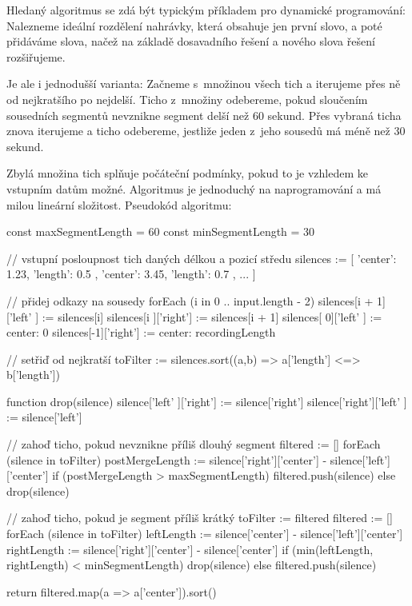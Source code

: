 Hledaný algoritmus se zdá být typickým příkladem pro dynamické programování:
Nalezneme ideální rozdělení nahrávky, která obsahuje jen první slovo, a poté
přidáváme slova, načež na základě dosavadního řešení a nového slova řešení
rozšiřujeme.

Je ale i jednodušší varianta: Začneme s~množinou všech tich a iterujeme přes ně
od nejkratšího po nejdelší. Ticho z~množiny odebereme, pokud sloučením sousedních
segmentů nevznikne segment delší než 60 sekund. Přes vybraná ticha znova
iterujeme a ticho odebereme, jestliže jeden z~jeho sousedů má méně než 30
sekund.

Zbylá množina tich splňuje počáteční podmínky, pokud to je vzhledem ke vstupním
datům možné. Algoritmus je jednoduchý na naprogramování a má milou
lineární složitost. Pseudokód algoritmu:

\begin{code}
const maxSegmentLength = 60
const minSegmentLength = 30

// vstupní posloupnost tich daných délkou a pozicí středu
silences := [
  { 'center': 1.23, 'length': 0.5 },
  { 'center': 3.45, 'length': 0.7 },
  ...
]

// přidej odkazy na sousedy
forEach (i in 0 .. input.length - 2) {
  silences[i + 1]['left' ] := silences[i]
  silences[i    ]['right'] := silences[i + 1]
}
silences[ 0]['left' ] := { center: 0 }
silences[-1]['right'] := { center: recordingLength }

// setřiď od nejkratší
toFilter := silences.sort((a,b) => a['length'] <=> b['length'])

function drop(silence) {
  silence['left' ]['right'] := silence['right']
  silence['right']['left' ] := silence['left']
}

// zahoď ticho, pokud nevznikne příliš dlouhý segment
filtered := []
forEach (silence in toFilter) {
  postMergeLength
    := silence['right']['center'] - silence['left']['center']
  if (postMergeLength > maxSegmentLength) {
    filtered.push(silence)
  } else {
    drop(silence)
  }
}

// zahoď ticho, pokud je segment příliš krátký
toFilter := filtered
filtered := []
forEach (silence in toFilter) {
  leftLength  := silence['center'] - silence['left']['center']
  rightLength := silence['right']['center'] - silence['center']
  if (min(leftLength, rightLength) < minSegmentLength) {
    drop(silence)
  } else {
    filtered.push(silence)
  }
}

return filtered.map(a => a['center']).sort()
\end{code}

